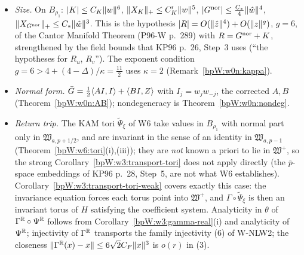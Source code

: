 \begin{remark}
\begin{itemize}
  analytic $B_{\rho_1}\to\mathfrak W^+$ on the \emph{complex} ball, real, and its real restriction
  $X_K^\R:B^E_{r_1}\to E_{a,p+1}$ is real analytic (Theorem~\ref{bpW:w3:main}(ii)). This is the literal analytic
  hypothesis in the Cartesian coordinates $(q,p)$; composing with the (analytic) action-angle substitution on the two
  tangential modes, and checking that $D(s,r)$ is mapped into $B_{\rho_1}$, is W5's step. No dependence on parameters: the
  parameter $\xi$ of P96-K enters later, through the action-angle substitution (KP96 p.~25, Step~1), and its
  Lipschitz seminorms are then obtained by Cauchy estimates in $\xi$ (KP96 p.~26, Step~3).
\item \emph{Size.} On $B_{\rho_1}$: $\lvert K\rvert\le C_K\lVert w\rVert^6$, $\lVert X_K\rVert_+\le C'_K\lVert w\rVert^5$,
  $\lvert G^{\rm nor}\rvert\le\frac{C_*}4\lVert \hat w\rVert^4$, $\lVert X_{G^{\rm nor}}\rVert_+\le C_*\lVert \hat w\rVert^3$. This is the
  hypothesis $\lvert R\rvert=O(\lVert \hat z\rVert^4)+O(\lVert z\rVert^g)$, $g=6$, of the Cantor Manifold Theorem (P96-W p.~289) with
  $R=G^{\rm nor}+K$, strengthened by the field bounds that KP96 p.~26, Step~3 uses (``the hypotheses for
  $R_u$, $R_v$''). The exponent condition $g=6>4+(4-\Delta)/\kappa=\frac{11}2$ uses $\kappa=2$
  (Remark~\ref{bpW:w0n:kappa}).
\item \emph{Normal form.} $\bar G=\frac12\langle AI,I\rangle+\langle BI,Z\rangle$ with $I_j=w_jw_{-j}$, the corrected $A,B$
  (Theorem~\ref{bpW:w0n:AB}); nondegeneracy is Theorem~\ref{bpW:w0n:nondeg}.
\item \emph{Return trip.} The KAM tori $\tilde\Psi_\xi$ of W6 take values in $B_{\rho_1}$ with normal part only in
  $\mathfrak W_{a,p+1/2}$, and are invariant in the sense of an identity in $\mathfrak W_{a,p-1}$
  (Theorem~\ref{bpW:w6:tori}(i),(iii)); they are \emph{not} known a priori to lie in $\mathfrak W^+$, so the strong
  Corollary~\ref{bpW:w3:transport-tori} does not apply directly (the $\bar p$-space embeddings of KP96 p.~28,
  Step~5, are not what W6 establishes). Corollary~\ref{bpW:w3:transport-tori-weak} covers exactly this case: the
  invariance equation forces each torus point into $\mathfrak W^+$, and $\Gamma\circ\tilde\Psi_\xi$ is then an
  invariant torus of $H$ satisfying the coefficient system. Analyticity in $\theta$ of $\Gamma^{\mathbb{R}}\circ\Psi^{\mathbb{R}}$ follows from
  Corollary~\ref{bpW:w3:gamma-real}(i) and analyticity of $\Psi^{\mathbb{R}}$; injectivity of $\Gamma^{\mathbb{R}}$ transports the family
  injectivity (6) of W-NLW2; the closeness $\lVert \Gamma^{\mathbb{R}}(x)-x\rVert\le6\sqrt2C_F\lVert x\rVert^3$ is $o(r)$ in (3).
\end{itemize}
\end{remark}

